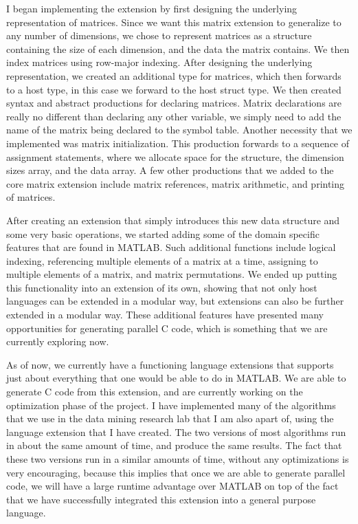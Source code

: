 \documentclass[a4paper,12pt]{article}
\begin{document}
I began implementing the extension by first designing the underlying representation of matrices. Since we want this matrix extension to generalize to any number of dimensions, we chose to represent matrices as a structure containing the size of each dimension, and the data the matrix contains. We then index matrices using row-major indexing. After designing the underlying representation, we created an additional type for matrices, which then forwards to a host type, in this case we forward to the host struct type. We then created syntax and abstract productions for declaring matrices.  Matrix declarations are really no different than declaring any other variable, we simply need to add the name of the matrix being declared to the symbol table. Another necessity that we implemented was matrix initialization. This production forwards to a sequence of assignment statements, where we allocate space for the structure, the dimension sizes array, and the data array. A few other productions that we added to the core matrix extension include matrix references, matrix arithmetic, and printing of matrices.  

After creating an extension that simply introduces this new data structure and some very basic operations, we started adding some of the domain specific features that are found in MATLAB.  Such additional functions include logical indexing, referencing multiple elements of a matrix at a time, assigning to multiple elements of a matrix, and matrix permutations.  We ended up putting this functionality into an extension of its own, showing that not only host languages can be extended in a modular way, but extensions can also be further extended in a modular way.  These additional features have presented many opportunities for generating parallel C code, which is something that we are currently exploring now.

As of now, we currently have a functioning language extensions that supports just about everything that one would be able to do in MATLAB. We are able to generate C code from this extension, and are currently working on the optimization phase of the project. I have implemented many of the algorithms that we use in the data mining research lab that I am also apart of, using the language extension that I have created. The two versions of most algorithms run in about the same amount of time, and produce the same results. The fact that these two versions run in a similar amounts of time, without any optimizations is very encouraging, because this implies that once we are able to generate parallel code, we will have a large runtime advantage over MATLAB on top of the fact that we have successfully integrated this extension into a general purpose language.
\end{document}
